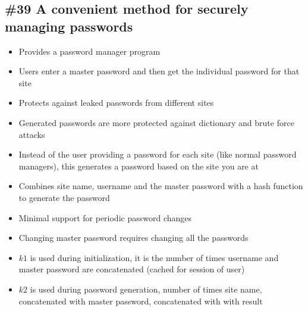 \subsection{\#39 A convenient method for securely managing passwords}
\begin{itemize}
	\item Provides a password manager program
	\item Users enter a master password and then get the individual password for that site
	\item Protects against leaked passwords from different sites
	\item Generated passwords are more protected against dictionary and brute force attacks
	\item Instead of the user providing a password for each site (like normal password managers), this generates a password based on the site you are at
	\item Combines site name, username and the master password with a hash function to generate the password
	\item Minimal support for periodic password changes
	\item Changing master password requires changing all the passwords
	\item $k1$ is used during initialization, it is the number of times username and master password are concatenated (cached for session of user)
	\item $k2$ is used during password generation, number of times site name, concatenated with master password, concatenated with with result
\end{itemize}